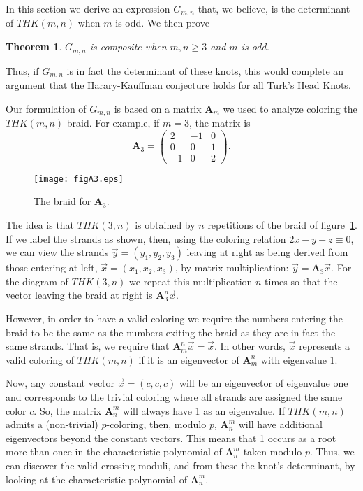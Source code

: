\documentclass{amsart}
\newtheorem{thm}{Theorem}
\begin{document}
\setcounter{thm}{4}

In this section we 
derive an expression $G_{m,n}$ that, we believe, is the determinant of $THK(m,n)$ when $m$ is odd. We then prove

\begin{thm}
$G_{m,n}$ is composite when $m,n \geq 3$ and $m$ is odd. 
\end{thm}

\setcounter{thm}{8}

Thus, if $G_{m,n}$ is in fact the determinant of these knots,
this would complete an argument that the Harary-Kauffman conjecture holds
for all Turk's Head Knots. 

Our formulation of $G_{m,n}$ is based on a 
matrix ${{\mathbf A}}_m$ we used to analyze coloring the $THK(m,n)$ braid. For example, if $m = 3$, the matrix is
$$
{{\mathbf A}}_3= \left( \begin{array}{ccc}
    2&-1&0\\
    0&0&1\\
    -1&0&2
\end{array} \right). $$

\begin{figure}[ht]
\begin{center}
\texttt{[image: figA3.eps]}
\caption{The braid for ${{\mathbf A}}_3$.}\label{figA3}
\end{center}
\end{figure} 

The idea is that $THK(3,n)$ is
obtained by $n$ repetitions of the braid of figure~\ref{figA3}.
If we label the 
strands as shown, then, using the coloring relation $2x -y - z \equiv 0$,
we can view the strands $\vec{y} = (y_1, y_2, y_3)$ leaving at right as being derived from those entering at left,
$\vec{x} = (x_1,x_2,x_3)$, by matrix multiplication: $\vec{y} = {{\mathbf A}}_3 \vec{x}$. For the diagram of $THK(3,n)$ we repeat this multiplication $n$ times so that the vector leaving the braid at right is ${{\mathbf A}}_3^n \vec{x}$. 

However, in order to have a valid coloring we require the
numbers entering the braid to be the same as the numbers exiting the
braid as they are in fact the same strands. That is, we require that
${{\mathbf A}}_m^n\vec{x}=\vec{x}$. In other words, $\vec{x}$ represents a valid
coloring of $THK(m,n)$ if it is an eigenvector of
${{\mathbf A}}_m^n$ with eigenvalue 1. 

Now, any constant vector $\vec{x} = (c,c,c)$ will be an eigenvector of
eigenvalue one and corresponds to the trivial coloring where all
strands are assigned the same color $c$. So, the matrix ${{\mathbf A}}_n^m$ will 
always have 1
as an eigenvalue. If $THK(m,n)$ admits a (non-trivial) $p$-coloring, then, modulo $p$, ${{\mathbf A}}_n^m$ will have additional eigenvectors beyond the constant vectors. This means that 1 occurs as a root more than once in the characteristic
polynomial of ${{\mathbf A}}_n^m$ taken modulo $p$. Thus, we can discover the 
valid crossing moduli, and from these the knot's determinant, by looking at
the characteristic polynomial of ${{\mathbf A}}_n^m$. 
\end{document}
